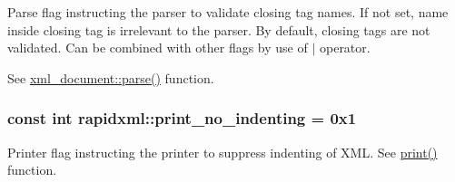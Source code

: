\label{d7/d8a/namespacerapidxml_a7ce8f40fda68338e20b56f41e48e49f3}
Parse flag instructing the parser to validate closing tag names. If not set, name inside closing tag is irrelevant to the parser. By default, closing tags are not validated. Can be combined with other flags by use of $|$ operator. \par
\par
 See \hyperlink{classrapidxml_1_1xml__document_ad510b0c5fd8bf0180a55ffb2476e59e4}{xml\_\-document::parse()} function. \hypertarget{namespacerapidxml_a65477b812a80f5bda693ec57e57de064}{
\subsubsection[{print\_\-no\_\-indenting}]{\setlength{\rightskip}{0pt plus 5cm}const int {\bf rapidxml::print\_\-no\_\-indenting} = 0x1}}
\label{d7/d8a/namespacerapidxml_a65477b812a80f5bda693ec57e57de064}


Printer flag instructing the printer to suppress indenting of XML. See \hyperlink{namespacerapidxml_ab94d570fc4c4ab2423813cd0243326b1}{print()} function. 

